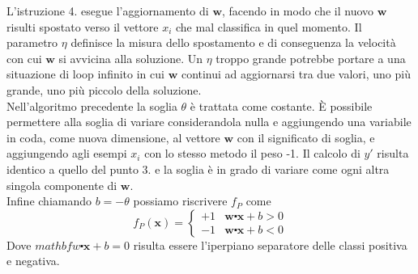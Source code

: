 \documentclass [10pt,a4paper,twoside,openright] {book}
\begin{document}
L'istruzione 4. esegue l'aggiornamento di $\mathbf{w}$, facendo in modo che il nuovo $\mathbf{w}$ risulti spostato verso il vettore $x_i$ che mal classifica in quel momento. Il parametro $\eta$ definisce la misura dello spostamento e di conseguenza la velocità con cui $\mathbf{w}$ si avvicina alla soluzione. Un $\eta$ troppo grande potrebbe portare a una situazione di loop infinito in cui $\mathbf{w}$ continui ad aggiornarsi tra due valori, uno più grande, uno più piccolo della soluzione.\\
Nell'algoritmo precedente la soglia $\theta$ è trattata come costante. È possibile permettere alla soglia di variare considerandola nulla e aggiungendo una variabile in coda, come nuova dimensione, al vettore $\mathbf{w}$ con il significato di soglia, e aggiungendo agli esempi $x_i$ con lo stesso metodo il peso -1. Il calcolo di $y'$ risulta identico a quello del punto 3. e la soglia è in grado di variare come ogni altra singola componente di $\mathbf{w}$.\\
Infine chiamando $b = -\theta$ possiamo riscrivere $f_P$ come
\[
f_P(\mathbf{x})=
\begin{cases}
+1 & \mathbf{w} \centerdot  \mathbf{x} + b > 0 \\
-1 & \mathbf{w} \centerdot \mathbf{x} +b<  0
\end{cases}
\]
Dove $mathbf{w} \centerdot  \mathbf{x} + b = 0$ risulta essere l'iperpiano separatore delle classi positiva e negativa.
\end{document}
